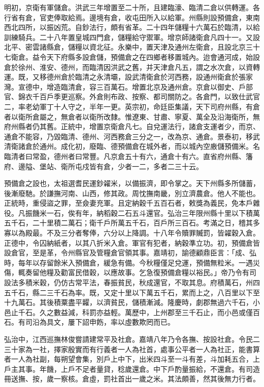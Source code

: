 明初，京衛有軍儲倉。洪武三年增置至二十所，且建臨濠、臨清二倉以供轉運。各行省有倉，官吏俸取給焉。邊境有倉，收屯田所入以給軍。州縣則設預備倉，東南西北四所，以振凶荒。自鈔法行，頗有省革。二十四年儲糧十六萬石於臨清，以給訓練騎兵。二十八年置皇城四門倉，儲糧給守禦軍。增京師諸衛倉凡四十一。又設北平、密雲諸縣倉，儲糧以資北征。永樂中，置天津及通州左衛倉，且設北京三十七衛倉。益令天下府縣多設倉儲，預備倉之在四鄉者移置城內。迨會通河成，始設倉於徐州、淮安、德州，而臨清因洪武之舊，并天津倉凡五，謂之水次倉，以資轉運。既，又移德州倉於臨清之永清壩，設武清衛倉於河西務，設通州衛倉於張家灣。宣德中，增造臨清倉，容三百萬石。增置北京及通州倉。京倉以御史、戶部官、錦衣千百戶季更巡察。外倉則布政、按察、都司關防之。各倉門，以致仕武官二，率老幼軍丁十人守之，半年一更。英宗初，命廷臣集議，天下司府州縣，有倉者以衛所倉屬之，無倉者以衛所改隸。惟遼東、甘肅、寧夏、萬全及沿海衛所，無府州縣者仍其舊。正統中，增置京衛倉凡七。自兌運法行，諸倉支運者少，而京、通倉不能容，乃毀臨清、德州、河西務倉三分之一，改為京、通倉。景泰初，移武清衛諸倉於通州。成化初，廢臨、德預備倉在城外者，而以城內空廒儲預備米。名臨清者曰常盈，德州者曰常豐。凡京倉五十有六，通倉十有六。直省府州縣、籓府、邊隘、堡站、衛所屯戍皆有倉，少者一二，多者二三十云。

預備倉之設也，太祖選耆民運鈔糴米，以備振濟，即令掌之。天下州縣多所儲蓄，後漸廢馳。於謙撫河南、山西，修其政。周忱撫南畿，別立濟農倉。他人不能也。正統時，重侵盜之罪，至僉妻充軍。且定納穀千五百石者，敕獎為義民，免本戶雜役。凡振饑米一石，俟有年，納稻穀二石五斗還官。弘治三年限州縣十里以下積萬五千石，二十里積二萬石；衛千戶所萬五千石，百戶所三百石。考滿之日，稽其多寡以為殿最。不及三分者奪俸，六分以上降調。十八年令贖罪贓罰，皆糴穀入倉。正德中，令囚納紙者，以其八折米入倉。軍官有犯者，納穀準立功。初，預備倉皆設倉官，至是革，令州縣官及管糧倉官領其事。嘉靖初，諭德顧鼎臣言：「成、弘時，每年以存留餘米入預備倉，緩急有備。今秋糧僅足兌運，預備無粒米。一遇災傷，輒奏留他糧及勸富民借穀，以應故事。乞急復預備倉糧以裕民。」帝乃令有司設法多積米穀，仍仿古常平法，春振貧民，秋成還官，不取其息。府積萬石，州四五千石，縣二三千石為率。既，又定十里以下萬五千石，累而上之，八百里以下至十九萬石。其後積粟盡平糶，以濟貧民，儲積漸減。隆慶時，劇郡無過六千石，小邑止千石。久之數益減，科罰亦益輕。萬歷中，上州郡至三千石止，而小邑或僅百石。有司沿為具文，屢下詔申飭，率以虛數欺罔而已。

弘治中，江西巡撫林俊嘗請建常平及社倉。嘉靖八年乃令各撫、按設社倉。令民二三十家為一社，擇家殷實而有行義者一人為社首，處事公平者一人為社正，能書算者一人為社副，每朔望會集，別戶上中下，出米四斗至一斗有差，斗加耗五合，上戶主其事。年饑，上戶不足者量貸，稔歲還倉。中下戶酌量振給，不還倉。有司造冊送撫、按，歲一察核。倉虛，罰社首出一歲之米。其法頗善，然其後無力行者。

